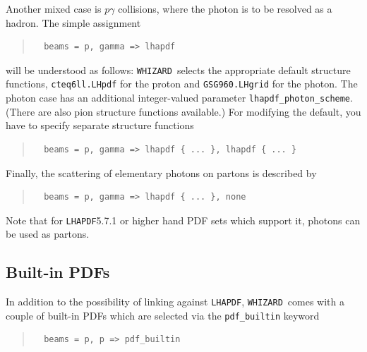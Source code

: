 \documentclass[12pt]{book}
\newcommand{\ttt}[1]{\texttt{#1}}
\newcommand{\whizard}{\texttt{WHIZARD}}
\newcommand{\lhapdf}{\texttt{LHAPDF}}
\begin{document}
Another mixed case is $p\gamma$ collisions, where the photon is to be
resolved as a hadron.  The simple assignment
\begin{quote}
\begin{footnotesize}
\begin{verbatim}
  beams = p, gamma => lhapdf
\end{verbatim}
\end{footnotesize}
\end{quote}
will be understood as follows: \whizard\ selects the appropriate default
structure functions, \ttt{cteq6ll.LHpdf} for the proton and
\ttt{GSG960.LHgrid} for the photon.  The photon case has an additional
integer-valued parameter \verb|lhapdf_photon_scheme|.  (There are also pion
structure functions available.)  For modifying the default, you have to
specify separate structure functions
\begin{quote}
\begin{footnotesize}
\begin{verbatim}
  beams = p, gamma => lhapdf { ... }, lhapdf { ... }
\end{verbatim}
\end{footnotesize}
\end{quote}
Finally, the scattering of elementary photons on partons is described by
\begin{quote}
\begin{footnotesize}
\begin{verbatim}
  beams = p, gamma => lhapdf { ... }, none
\end{verbatim}
\end{footnotesize}
\end{quote}

Note that for \lhapdf 5.7.1 or higher hand PDF sets which support it,
photons can be used as partons.

\subsection{Built-in PDFs}
\label{sec:built-in-pdf}

In addition to the possibility of linking against \lhapdf, \whizard\
comes with a couple of built-in PDFs which are selected via the
\verb?pdf_builtin? keyword 
%
\begin{quote}
\begin{footnotesize}
\begin{verbatim}
  beams = p, p => pdf_builtin
\end{verbatim}
\end{footnotesize}
\end{quote}
%
\end{document}
